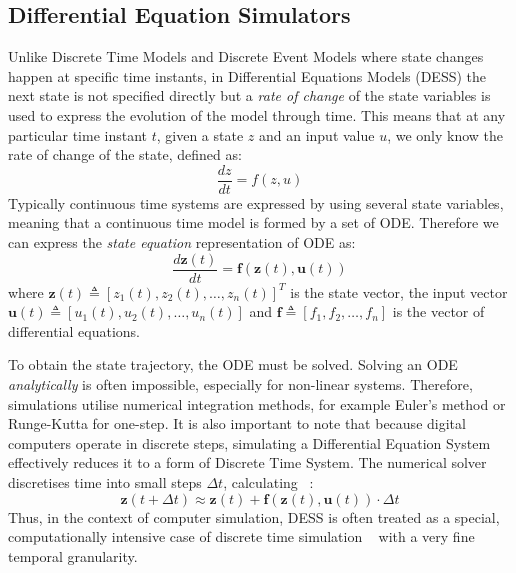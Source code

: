 \subsection{Differential Equation Simulators}\label{ssec:dess}

Unlike Discrete Time Models and Discrete Event Models where state changes
happen at specific time instants, in Differential Equations Models (DESS) the
next state is not specified directly but a \emph{rate of change} of the state
variables is used to express the evolution of the model through time. This
means that at any particular time instant $t$, given a state $z$ and an input
value $u$, we only know the rate of change of the state, defined as:
%
\begin{equation}
	\frac{dz}{dt} = f(z, u)
\end{equation}
%
Typically continuous time systems are expressed by using several state
variables, meaning that a continuous time model is formed by a set of \ac{ODE}.
Therefore we can express the \emph{state equation} representation of \ac{ODE}
as:
%
\begin{equation}
	\frac{d\mathbf{z}(t)}{dt} = \mathbf{f}(\mathbf{z}(t), \mathbf{u}(t))
\end{equation}
%
where $\mathbf{z}(t) \triangleq [z_1(t), z_2(t), \dots, z_n(t)]^T$ is the state
vector, the input vector $\mathbf{u}(t) \triangleq [u_1(t), u_2(t), \dots,
		u_n(t)]$ and $\mathbf{f} \triangleq [f_1, f_2, \dots, f_n]$ is the vector of
differential equations.

To obtain the state trajectory, the \ac{ODE} must be solved. Solving an
\ac{ODE} \emph{analytically} is often impossible, especially for non-linear
systems. Therefore, simulations utilise numerical integration methods, for
example Euler's method or Runge-Kutta for one-step. It is also important to
note that because digital computers operate in discrete steps, simulating a
Differential Equation System effectively reduces it to a form of Discrete Time
System. The numerical solver discretises time into small steps $\Delta t$,
calculating ~\cite{cellier2006continuous}:
%
\begin{equation}
	\mathbf{z}(t + \Delta t) \approx \mathbf{z}(t) + \mathbf{f}(\mathbf{z}(t), \mathbf{u}(t)) \cdot \Delta t
\end{equation}
%
Thus, in the context of computer simulation, DESS is often treated as a
special, computationally intensive case of discrete time simulation
~\cite{law2007simulation} with a very fine temporal granularity.

